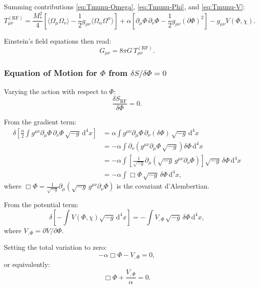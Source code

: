 \documentclass[11pt,a4paper]{article}
\numberwithin{equation}{section}
\theoremstyle{plain}
\theoremstyle{definition}
\theoremstyle{remark}
\newcommand{\dd}{\mathrm{d}}
\begin{document}
Summing contributions \eqref{eq:Tmunu-Omega}, \eqref{eq:Tmunu-Phi}, and \eqref{eq:Tmunu-V}:
\begin{equation}
T_{\mu\nu}^{(\mathrm{RF})} = \frac{M_*^2}{4}\left[\langle \Omega_\mu \Omega_\nu \rangle - \frac{1}{2}g_{\mu\nu}\langle \Omega_\alpha \Omega^\alpha \rangle\right] + \alpha\left[\partial_\mu\Phi\,\partial_\nu\Phi - \frac{1}{2}g_{\mu\nu}(\partial\Phi)^2\right] - g_{\mu\nu}V(\Phi,\chi).
\label{eq:Tmunu-full}
\end{equation}

Einstein's field equations then read:
\begin{equation}
G_{\mu\nu} = 8\pi G\, T_{\mu\nu}^{(\mathrm{RF})}.
\label{eq:einstein-rf}
\end{equation}

\subsubsection{Equation of Motion for $\Phi$ from $\delta S/\delta\Phi = 0$}

Varying the action with respect to $\Phi$:
\begin{equation}
\frac{\delta S_{\mathrm{RF}}}{\delta\Phi} = 0.
\end{equation}

From the gradient term:
\begin{align}
\delta\left[\frac{\alpha}{2}\int g^{\mu\nu}\partial_\mu\Phi\,\partial_\nu\Phi\,\sqrt{-g}\,\dd^4x\right] &= \alpha\int g^{\mu\nu}\partial_\mu\Phi\,\partial_\nu(\delta\Phi)\,\sqrt{-g}\,\dd^4x\\
&= -\alpha\int \partial_\nu\left(g^{\mu\nu}\partial_\mu\Phi\,\sqrt{-g}\right)\delta\Phi\,\dd^4x\\
&= -\alpha\int \left[\frac{1}{\sqrt{-g}}\partial_\mu\left(\sqrt{-g}\,g^{\mu\nu}\partial_\nu\Phi\right)\right]\sqrt{-g}\,\delta\Phi\,\dd^4x\\
&= -\alpha\int \Box\Phi\,\sqrt{-g}\,\delta\Phi\,\dd^4x,
\end{align}
where $\Box\Phi = \frac{1}{\sqrt{-g}}\partial_\mu(\sqrt{-g}\,g^{\mu\nu}\partial_\nu\Phi)$ is the covariant d'Alembertian.

From the potential term:
\begin{equation}
\delta\left[-\int V(\Phi,\chi)\sqrt{-g}\,\dd^4x\right] = -\int V_{,\Phi}\,\sqrt{-g}\,\delta\Phi\,\dd^4x,
\end{equation}
where $V_{,\Phi} = \partial V/\partial\Phi$.

Setting the total variation to zero:
\begin{equation}
-\alpha\Box\Phi - V_{,\Phi} = 0,
\end{equation}
or equivalently:
\begin{equation}
\Box\Phi + \frac{V_{,\Phi}}{\alpha} = 0.
\label{eq:phi-eom-general}
\end{equation}
\end{document}
